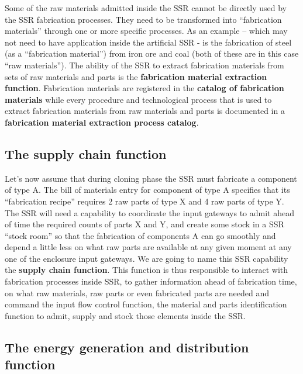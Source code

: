 \hypertarget{RefHeading3064306210128}{}Some of the raw materials
admitted inside the SSR cannot be directly used by the SSR fabrication
processes. They need to be transformed into “fabrication materials”
through one or more specific processes. As an example – which may not
need to have application inside the artificial SSR - is the fabrication
of steel (as a “fabrication material”) from iron ore and coal (both of
these are in this case “raw materials”). The ability of the SSR to
extract fabrication materials from sets of raw materials and parts is
the \textbf{fabrication material extraction function}.  Fabrication
materials are registered in the \textbf{catalog of fabrication
materials }while every procedure and technological process that is used
to extract fabrication materials from raw materials and parts is
documented in a \textbf{fabrication material extraction process
catalog}.

\subsection[The supply chain function]{The supply chain function}

\hypertarget{RefHeading3066306210128}{}Let’s now assume that during
cloning phase the SSR must fabricate a component of type A.  The bill
of materials entry for component of type A specifies that its
“fabrication recipe” requires 2 raw parts of type X and 4 raw parts of
type Y.  The SSR will need a capability to coordinate the input
gateways to admit ahead of time the required counts of parts X and Y,
and create some stock in a SSR “stock room” so that the fabrication of
components A can go smoothly and depend a little less on what raw parts
are available at any given moment at any one of the enclosure input
gateways. We are going to name this SSR capability the \textbf{supply
chain function}. This function is thus responsible to interact with
fabrication processes inside SSR, to gather information ahead of
fabrication time, on what raw materials, raw parts or even fabricated
parts are needed and command the input flow control function, the
material and parts identification function to admit, supply and stock
those elements inside the SSR.

\subsection[The energy generation and distribution function]{The energy
generation and distribution function}

